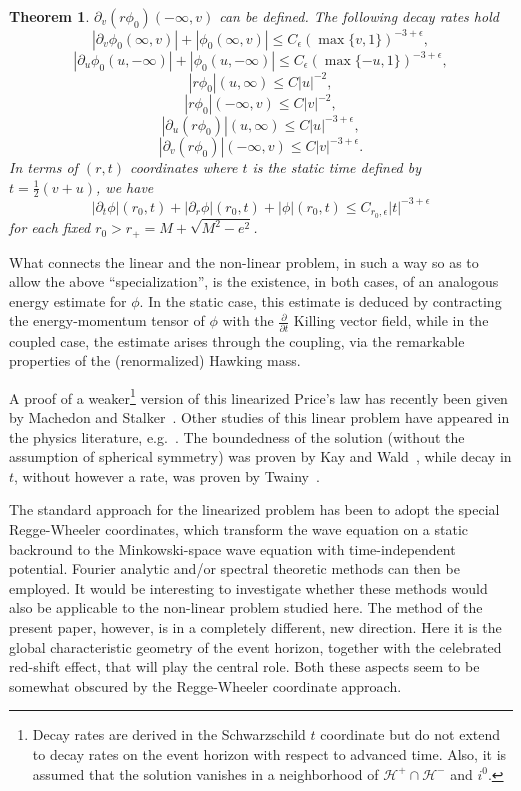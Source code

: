 \documentclass{article}
\newtheorem{theorem}{Theorem}[section]
\begin{document}
\begin{theorem}
$\partial_v(r\phi_0)(-\infty,v)$ can be defined. 
The following decay
rates hold
\[
|\partial_v\phi_0(\infty,v)|+|\phi_0(\infty,v)|
\le C_\epsilon (\max\{v,1\})^{-3+\epsilon},
\]
\[
|\partial_u\phi_0(u,-\infty)|+|\phi_0(u, -\infty)|
\le C_\epsilon (\max\{-u, 1\})^{-3+\epsilon},
\]
\[
|r\phi_0|(u,\infty)\le C|u|^{-2},
\]
\[
|r\phi_0|(-\infty,v)\le C|v|^{-2},
\]
\[
|\partial_u(r\phi_0)|(u,\infty)\le C|u|^{-3+\epsilon},
\]
\[
|\partial_v(r\phi_0)|(-\infty,v)\le C|v|^{-3+\epsilon}.
\]
In terms of $(r,t)$ coordinates where $t$ is the static time
defined by $t=\frac12(v+u)$,
we have
\[
|\partial_t\phi|(r_0,t)+|\partial_r\phi|(r_0,t)+|\phi|(r_0,t)
\le C_{r_0,\epsilon}|t|^{-3+\epsilon}
\]
for each fixed $r_0>r_+=M+\sqrt{M^2-e^2}$.
\end{theorem}

What connects the linear and the non-linear problem,
in such a way so as to allow the above ``specialization'',
is the existence, in both cases, of an analogous energy estimate for $\phi$. 
In the static case, this estimate
is deduced by contracting the energy-momentum tensor
of $\phi$ with the $\frac\partial{\partial t}$ Killing vector field, 
while in the coupled case, the estimate arises through the coupling,
via the remarkable properties of the (renormalized) Hawking mass.

A proof of a weaker\footnote{Decay rates are derived
in the Schwarzschild $t$ coordinate but do not extend
to decay rates on the event horizon with respect to
advanced time. Also, it is assumed that the solution
vanishes in a neighborhood of
$\mathcal{H}^+\cap\mathcal{H}^-$ and $i^0$.} 
version of this linearized Price's law has 
recently been given by Machedon
and Stalker~\cite{st:pc}. Other studies of this linear
problem have appeared in the physics literature, 
e.g.~\cite{clsy:wpgs}.
The boundedness of the solution (without the assumption
of spherical symmetry) was proven 
by Kay and Wald~\cite{kw:lss}, 
while decay in $t$, without however a rate, was proven by Twainy~\cite{ft:td}.
 
The standard approach for the linearized problem
has been to adopt the special Regge-Wheeler coordinates, which transform the
wave equation on a static backround to the Minkowski-space wave 
equation with time-independent potential. Fourier analytic and/or spectral theoretic 
methods can then be employed. It would be interesting to investigate whether 
these methods would also be applicable to the non-linear 
problem studied here. The method of the present paper, however, is in a 
completely different, new direction. Here it is the global characteristic geometry of the 
event horizon, together with the celebrated red-shift effect,
that will play the central role. Both these aspects seem to
be somewhat obscured by the Regge-Wheeler coordinate approach.
\end{document}
